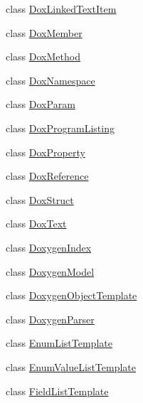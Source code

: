 \begin{DoxyCompactItemize}
\item 
class \hyperlink{class_software_engineering_tools_1_1_documentation_1_1_dox_linked_text_item}{Dox\+Linked\+Text\+Item}
\item 
class \hyperlink{class_software_engineering_tools_1_1_documentation_1_1_dox_member}{Dox\+Member}
\item 
class \hyperlink{class_software_engineering_tools_1_1_documentation_1_1_dox_method}{Dox\+Method}
\item 
class \hyperlink{class_software_engineering_tools_1_1_documentation_1_1_dox_namespace}{Dox\+Namespace}
\item 
class \hyperlink{class_software_engineering_tools_1_1_documentation_1_1_dox_param}{Dox\+Param}
\item 
class \hyperlink{class_software_engineering_tools_1_1_documentation_1_1_dox_program_listing}{Dox\+Program\+Listing}
\item 
class \hyperlink{class_software_engineering_tools_1_1_documentation_1_1_dox_property}{Dox\+Property}
\item 
class \hyperlink{class_software_engineering_tools_1_1_documentation_1_1_dox_reference}{Dox\+Reference}
\item 
class \hyperlink{class_software_engineering_tools_1_1_documentation_1_1_dox_struct}{Dox\+Struct}
\item 
class \hyperlink{class_software_engineering_tools_1_1_documentation_1_1_dox_text}{Dox\+Text}
\item 
class \hyperlink{class_software_engineering_tools_1_1_documentation_1_1_doxygen_index}{Doxygen\+Index}
\item 
class \hyperlink{class_software_engineering_tools_1_1_documentation_1_1_doxygen_model}{Doxygen\+Model}
\item 
class \hyperlink{class_software_engineering_tools_1_1_documentation_1_1_doxygen_object_template}{Doxygen\+Object\+Template}
\item 
class \hyperlink{class_software_engineering_tools_1_1_documentation_1_1_doxygen_parser}{Doxygen\+Parser}
\item 
class \hyperlink{class_software_engineering_tools_1_1_documentation_1_1_enum_list_template}{Enum\+List\+Template}
\item 
class \hyperlink{class_software_engineering_tools_1_1_documentation_1_1_enum_value_list_template}{Enum\+Value\+List\+Template}
\item 
class \hyperlink{class_software_engineering_tools_1_1_documentation_1_1_field_list_template}{Field\+List\+Template}

\end{DoxyCompactItemize}
